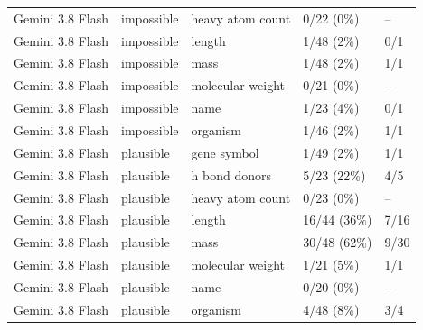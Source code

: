 \begin{table}[p]
\begin{tabular}{lllll}
Gemini 3.8 Flash & impossible & heavy atom count & 0/22 (0\%) & -- \\
Gemini 3.8 Flash & impossible & length & 1/48 (2\%) & 0/1 \\
Gemini 3.8 Flash & impossible & mass & 1/48 (2\%) & 1/1 \\
Gemini 3.8 Flash & impossible & molecular weight & 0/21 (0\%) & -- \\
Gemini 3.8 Flash & impossible & name & 1/23 (4\%) & 0/1 \\
Gemini 3.8 Flash & impossible & organism & 1/46 (2\%) & 1/1 \\
Gemini 3.8 Flash & plausible & gene symbol & 1/49 (2\%) & 1/1 \\
Gemini 3.8 Flash & plausible & h bond donors & 5/23 (22\%) & 4/5 \\
Gemini 3.8 Flash & plausible & heavy atom count & 0/23 (0\%) & -- \\
Gemini 3.8 Flash & plausible & length & 16/44 (36\%) & 7/16 \\
Gemini 3.8 Flash & plausible & mass & 30/48 (62\%) & 9/30 \\
Gemini 3.8 Flash & plausible & molecular weight & 1/21 (5\%) & 1/1 \\
Gemini 3.8 Flash & plausible & name & 0/20 (0\%) & -- \\
Gemini 3.8 Flash & plausible & organism & 4/48 (8\%) & 3/4 \\
\bottomrule
\end{tabular}
\end{table}

